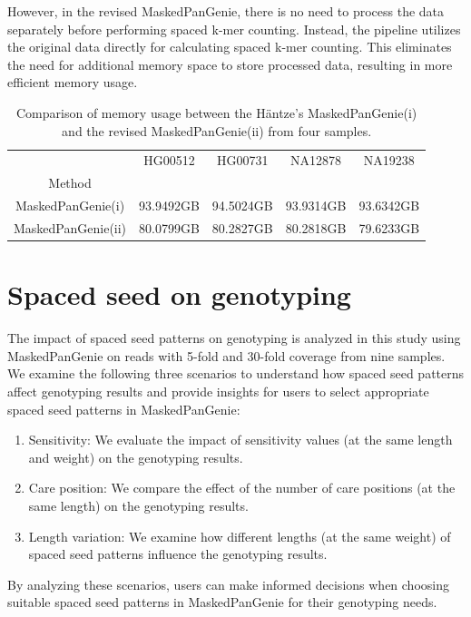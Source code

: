 \documentclass{PHlab-thesis}
\begin{document}
However, in the revised MaskedPanGenie, there is no need to process the data separately before performing spaced k-mer counting. Instead, the pipeline utilizes the original data directly for calculating spaced k-mer counting. This eliminates the need for additional memory space to store processed data, resulting in more efficient memory usage.

\begin{table}[ht!]
	\centering
	\begin{tabular*}{\textwidth}{@{\extracolsep{\fill}}ccccc@{\extracolsep{\fill}}}
        \toprule
         & HG00512 & HG00731 & NA12878 & NA19238 \\
         Method & & & & \\
        \midrule
        MaskedPanGenie(i)& 93.9492GB & 94.5024GB & 93.9314GB & 93.6342GB\\
        MaskedPanGenie(ii)& 80.0799GB & 80.2827GB & 80.2818GB & 79.6233GB\\
        \bottomrule 
	\end{tabular*}
	\caption{Comparison of memory usage between the Häntze's MaskedPanGenie(i) and the revised MaskedPanGenie(ii) from four samples.}
	\label{table:Space_MaskedPanGenie}
\end{table}

\section{Spaced seed on genotyping}
The impact of spaced seed patterns on genotyping is analyzed in this study using MaskedPanGenie on reads with 5-fold and 30-fold coverage from nine samples. We examine the following three scenarios to understand how spaced seed patterns affect genotyping results and provide insights for users to select appropriate spaced seed patterns in MaskedPanGenie:
\begin{enumerate}
    \item Sensitivity: We evaluate the impact of sensitivity values (at the same length and weight) on the genotyping results.
    \item Care position: We compare the effect of the number of care positions (at the same length) on the genotyping results.
    \item Length variation: We examine how different lengths (at the same weight) of spaced seed patterns influence the genotyping results.
\end{enumerate}
By analyzing these scenarios, users can make informed decisions when choosing suitable spaced seed patterns in MaskedPanGenie for their genotyping needs.
\end{document}
